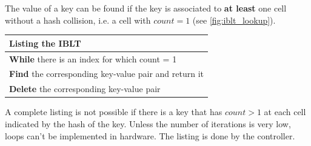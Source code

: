 \documentclass[11pt,oneside,a4paper]{article}
\begin{document}
\noindent The value of a key can be found if the key is associated to \textbf{at least} one cell without a hash collision, i.e. a cell with $count = 1$ (see \ref{fig:iblt_lookup}).

\begin{center}
	\begin{tabular}{ |p{100mm}| } 
		\hline
		Listing the IBLT \\
		\hline
		\textbf{While} there is an index for which count = 1 \\
		\hspace{3mm} \textbf{Find} the corresponding key-value pair and return it \\
		\hspace{3mm} \textbf{Delete} the corresponding key-value pair \\
		\hline
	\end{tabular}
\end{center}

\noindent A complete listing is not possible if there is a key that has $count > 1$ at each cell indicated by the hash of the key. Unless the number of iterations is very low, loops can’t be implemented in hardware. The listing is done by the controller.
\end{document}
